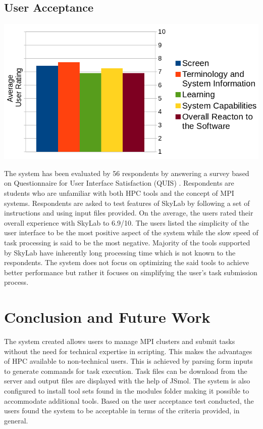 	\subsection{User Acceptance}
	\begin{center}			
			\includegraphics[scale=0.32]{./images/uat_graph.png}			
	\end{center}
	The system has been evaluated by 56 respondents by answering a survey based on Questionnaire for User Interface Satisfaction (QUIS) \cite{chin1988development}. Respondents are students who are unfamiliar with both HPC tools and the concept of MPI systems.  Respondents are asked to test features of SkyLab by following a set of instructions and using input files provided. On the average, the users rated their overall experience with SkyLab to 6.9/10. The users listed the simplicity of the user interface to be the most positive aspect of the system while the slow speed of task processing is said to be the most negative. Majority of the tools supported by SkyLab have inherently long processing time which is not known to the respondents. The system does not focus on optimizing the said tools to achieve better performance but rather it focuses on simplifying the user's task submission process. 

	
\section{Conclusion and Future Work}
The system created allows users to manage MPI clusters and submit tasks without the need for technical expertise in scripting. This makes the advantages of HPC available to non-technical users. This is achieved by parsing form inputs to generate commands for task execution. Task files can be download from the server and output files are displayed with the help of JSmol\cite{IJCH:IJCH201300024}. The system is also configured to install tool sets found in the modules folder making it possible to accommodate additional tools. Based on the user acceptance test conducted, the users found the system to be acceptable in terms of the criteria provided, in general. 

